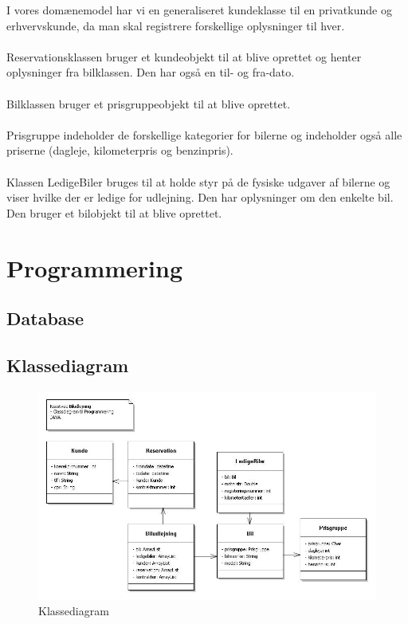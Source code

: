 \documentclass[11pt]{article}
\begin{document}
I vores domænemodel har vi en generaliseret kundeklasse til en privatkunde og erhvervskunde, da man skal registrere forskellige oplysninger til hver.\\\\
Reservationsklassen bruger et kundeobjekt til at blive oprettet og henter oplysninger fra bilklassen. Den har også en til- og fra-dato.\\\\
Bilklassen bruger et prisgruppeobjekt til at blive oprettet.\\\\
Prisgruppe indeholder de forskellige kategorier for bilerne og indeholder også alle priserne (dagleje, kilometerpris og benzinpris).\\\\
Klassen LedigeBiler bruges til at holde styr på de fysiske udgaver af bilerne og viser hvilke der er ledige for udlejning. Den har oplysninger om den enkelte bil. Den bruger et bilobjekt til at blive oprettet.

\section*{Programmering}
\subsection*{Database}


\subsection*{Klassediagram}
\begin{figure}
  \centering
  \includegraphics[width=15cm]{Classdiagram_prog.jpg}
  \caption{Klassediagram}
  \label{fig:Klassediagram}
\end{figure}
\end{document}
